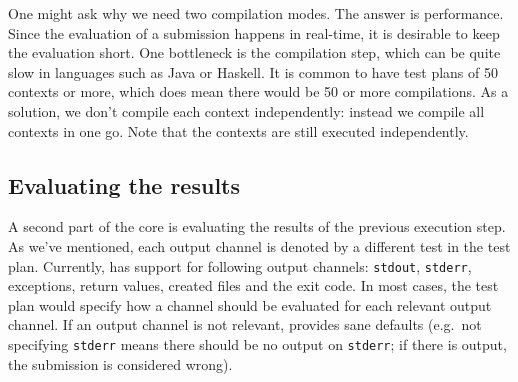 \documentclass[5p,number]{elsarticle}
\begin{document}
    One might ask why we need two compilation modes.
    The answer is performance.
    Since the evaluation of a submission happens in real-time, it is desirable to keep the evaluation short.
    One bottleneck is the compilation step, which can be quite slow in languages such as Java or Haskell.
    It is common to have test plans of 50 contexts or more, which does mean there would be 50 or more compilations.
    As a solution, we don't compile each context independently: instead we compile all contexts in one go.
    Note that the contexts are still executed independently.

    \subsection{Evaluating the results}\label{subsec:evaluating-the-results}
    
    A second part of the core is evaluating the results of the previous execution step.
    As we've mentioned, each output channel is denoted by a different test in the test plan.
    Currently, \tested{} has support for following output channels: \texttt{stdout}, \texttt{stderr}, exceptions, return values, created files and the exit code.
    In most cases, the test plan would specify how a channel should be evaluated for each relevant output channel.
    If an output channel is not relevant, \tested{} provides sane defaults (e.g.\ not specifying \texttt{stderr} means there should be no output on \texttt{stderr}; if there is output, the submission is considered wrong).
\end{document}
